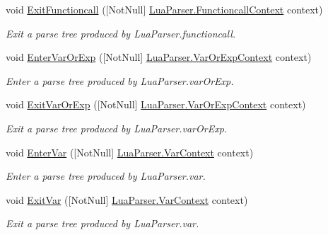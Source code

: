\begin{DoxyCompactItemize}
void \mbox{\hyperlink{interfacezlua_1_1_i_lua_listener_acd0b2537f173e36443c60445ef23eeb6}{Exit\+Functioncall}} (\mbox{[}Not\+Null\mbox{]} \mbox{\hyperlink{classzlua_1_1_lua_parser_1_1_functioncall_context}{Lua\+Parser.\+Functioncall\+Context}} context)
\begin{DoxyCompactList}\small\item\em Exit a parse tree produced by Lua\+Parser.\+functioncall. \end{DoxyCompactList}\item 
void \mbox{\hyperlink{interfacezlua_1_1_i_lua_listener_aece0cb0bc8e75c07d7bf71375714a6e7}{Enter\+Var\+Or\+Exp}} (\mbox{[}Not\+Null\mbox{]} \mbox{\hyperlink{classzlua_1_1_lua_parser_1_1_var_or_exp_context}{Lua\+Parser.\+Var\+Or\+Exp\+Context}} context)
\begin{DoxyCompactList}\small\item\em Enter a parse tree produced by Lua\+Parser.\+var\+Or\+Exp. \end{DoxyCompactList}\item 
void \mbox{\hyperlink{interfacezlua_1_1_i_lua_listener_a0c463bdafad827e9a749f5276a7bb7df}{Exit\+Var\+Or\+Exp}} (\mbox{[}Not\+Null\mbox{]} \mbox{\hyperlink{classzlua_1_1_lua_parser_1_1_var_or_exp_context}{Lua\+Parser.\+Var\+Or\+Exp\+Context}} context)
\begin{DoxyCompactList}\small\item\em Exit a parse tree produced by Lua\+Parser.\+var\+Or\+Exp. \end{DoxyCompactList}\item 
void \mbox{\hyperlink{interfacezlua_1_1_i_lua_listener_a1feba01e341c07825901bf0a1cd723e3}{Enter\+Var}} (\mbox{[}Not\+Null\mbox{]} \mbox{\hyperlink{classzlua_1_1_lua_parser_1_1_var_context}{Lua\+Parser.\+Var\+Context}} context)
\begin{DoxyCompactList}\small\item\em Enter a parse tree produced by Lua\+Parser.\+var. \end{DoxyCompactList}\item 
void \mbox{\hyperlink{interfacezlua_1_1_i_lua_listener_ab0371ff8288b99ae8fe05ccba2980ee2}{Exit\+Var}} (\mbox{[}Not\+Null\mbox{]} \mbox{\hyperlink{classzlua_1_1_lua_parser_1_1_var_context}{Lua\+Parser.\+Var\+Context}} context)
\begin{DoxyCompactList}\small\item\em Exit a parse tree produced by Lua\+Parser.\+var. \end{DoxyCompactList}\item 

\end{DoxyCompactItemize}
